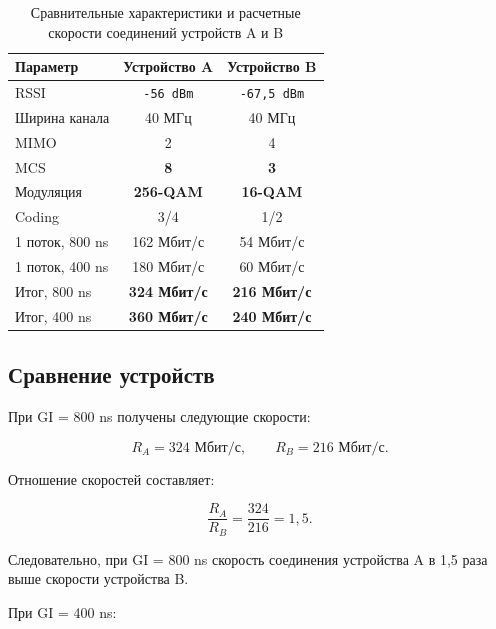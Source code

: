 \begin{table}[H]
\centering
\begin{tabular}{|l|c|c|}
\hline
\textbf{Параметр} &
\textbf{Устройство A} &
\textbf{Устройство B} \\ \hline

RSSI &
\texttt{-56 dBm} &
\texttt{-67,5 dBm} \\ \hline

Ширина канала &
40 МГц &
40 МГц \\ \hline

MIMO &
2 &
4 \\ \hline

MCS &
\textbf{8} &
\textbf{3} \\ \hline

Модуляция &
\textbf{256-QAM} &
\textbf{16-QAM} \\ \hline

Coding &
3/4 &
1/2 \\ \hline

1 поток, 800 ns &
162 Мбит/с &
54 Мбит/с \\ \hline

1 поток, 400 ns &
180 Мбит/с &
60 Мбит/с \\ \hline

Итог, 800 ns &
\textbf{324 Мбит/с} &
\textbf{216 Мбит/с} \\ \hline

Итог, 400 ns &
\textbf{360 Мбит/с} &
\textbf{240 Мбит/с} \\ \hline

\end{tabular}
\caption{Сравнительные характеристики и расчетные скорости соединений устройств A и B}
\label{tab:wifi_rates_comparison}
\end{table}

\subsection*{Сравнение устройств}

При GI = 800 ns получены следующие скорости:

\[
R_A=324\text{ Мбит/с}, \qquad
R_B=216\text{ Мбит/с}.
\]

Отношение скоростей составляет:

\[
\frac{R_A}{R_B}
=
\frac{324}{216}=1{,}5.
\]

Следовательно, при GI = 800 ns скорость соединения устройства A в 1,5 раза выше скорости устройства B.

При GI = 400 ns:

